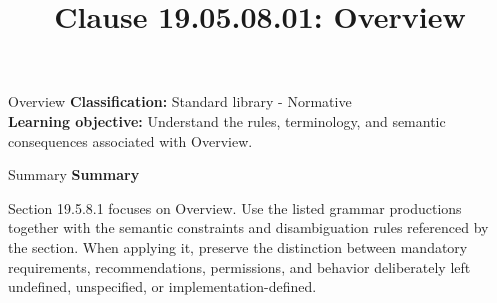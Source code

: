 \documentclass[10pt,letterpaper]{article}
\title{Clause 19.05.08.01: Overview}
\author{}
\date{}
\begin{document}
\maketitle
\begin{CornellOverviewBox}{Overview}
\textbf{Classification:} Standard library - Normative\\[2pt]
\textbf{Learning objective:} Understand the rules, terminology, and semantic consequences associated with Overview.
\end{CornellOverviewBox}\begin{CornellSummaryBox}{Summary}
{\sffamily\bfseries\color{Accent} Summary}\par\vspace{3pt}Section 19.5.8.1 focuses on Overview. Use the listed grammar productions together with the semantic constraints and disambiguation rules referenced by the section. When applying it, preserve the distinction between mandatory requirements, recommendations, permissions, and behavior deliberately left undefined, unspecified, or implementation-defined.
\end{CornellSummaryBox}
\end{document}
